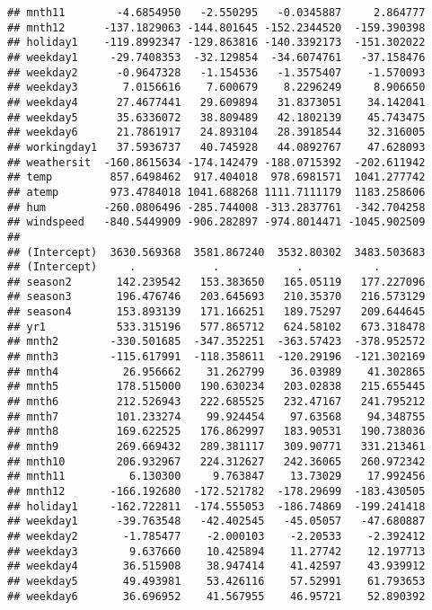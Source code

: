 \documentclass[]{article}
\begin{document}
\begin{verbatim}
## mnth11        -4.6854950   -2.550295   -0.0345887     2.864777
## mnth12      -137.1829063 -144.801645 -152.2344520  -159.390398
## holiday1    -119.8992347 -129.863816 -140.3392173  -151.302022
## weekday1     -29.7408353  -32.129854  -34.6074761   -37.158476
## weekday2      -0.9647328   -1.154536   -1.3575407    -1.570093
## weekday3       7.0156616    7.600679    8.2296249     8.906650
## weekday4      27.4677441   29.609894   31.8373051    34.142041
## weekday5      35.6336072   38.809489   42.1802139    45.743475
## weekday6      21.7861917   24.893104   28.3918544    32.316005
## workingday1   37.5936737   40.745928   44.0892767    47.628093
## weathersit  -160.8615634 -174.142479 -188.0715392  -202.611942
## temp         857.6498462  917.404018  978.6981571  1041.277742
## atemp        973.4784018 1041.688268 1111.7111179  1183.258606
## hum         -260.0806496 -285.744008 -313.2837761  -342.704258
## windspeed   -840.5449909 -906.282897 -974.8014471 -1045.902509
##                                                               
## (Intercept)  3630.569368  3581.867240  3532.80302  3483.503683
## (Intercept)     .            .            .           .       
## season2       142.239542   153.383650   165.05119   177.227096
## season3       196.476746   203.645693   210.35370   216.573129
## season4       153.893139   171.166251   189.75297   209.644645
## yr1           533.315196   577.865712   624.58102   673.318478
## mnth2        -330.501685  -347.352251  -363.57423  -378.952572
## mnth3        -115.617991  -118.358611  -120.29196  -121.302169
## mnth4          26.956662    31.262799    36.03989    41.302865
## mnth5         178.515000   190.630234   203.02838   215.655445
## mnth6         212.526943   222.685525   232.47167   241.795212
## mnth7         101.233274    99.924454    97.63568    94.348755
## mnth8         169.622525   176.862997   183.90531   190.738036
## mnth9         269.669432   289.381117   309.90771   331.213461
## mnth10        206.932967   224.312627   242.36065   260.972342
## mnth11          6.130300     9.763847    13.73029    17.992456
## mnth12       -166.192680  -172.521782  -178.29699  -183.430505
## holiday1     -162.722811  -174.555053  -186.74869  -199.241418
## weekday1      -39.763548   -42.402545   -45.05057   -47.680887
## weekday2       -1.785477    -2.000103    -2.20533    -2.392412
## weekday3        9.637660    10.425894    11.27742    12.197713
## weekday4       36.515908    38.947414    41.42597    43.939912
## weekday5       49.493981    53.426116    57.52991    61.793653
## weekday6       36.696952    41.567955    46.95721    52.890392

\end{verbatim}
\end{document}
